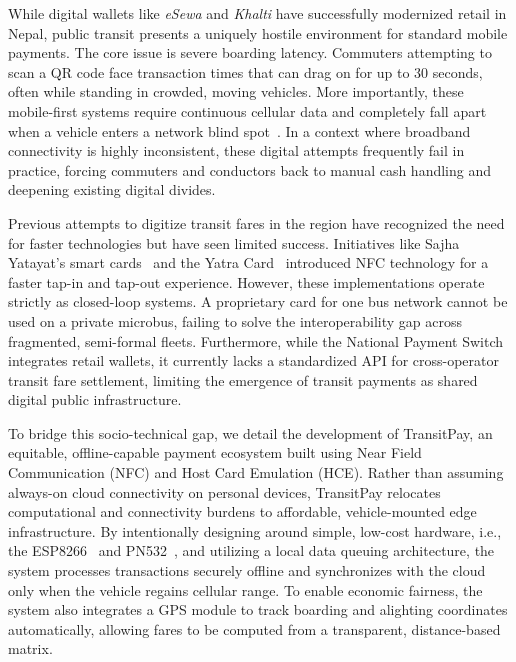 \documentclass[manuscript,review,anonymous]{acmart}
\begin{document}
While digital wallets like \textit{eSewa} and \textit{Khalti} have successfully modernized retail in Nepal, public transit presents a uniquely hostile environment for standard mobile payments. The core issue is severe boarding latency. Commuters attempting to scan a QR code face transaction times that can drag on for up to 30 seconds, often while standing in crowded, moving vehicles. More importantly, these mobile-first systems require continuous cellular data and completely fall apart when a vehicle enters a network blind spot~\cite{gupta2022m, KC_2026,kandel2024financial}. In a context where broadband connectivity is highly inconsistent, these digital attempts frequently fail in practice, forcing commuters and conductors back to manual cash handling and deepening existing digital divides.

Previous attempts to digitize transit fares in the region have recognized the need for faster technologies but have seen limited success. Initiatives like Sajha Yatayat's smart cards~\cite{annapurnaexpress2026article} and the Yatra Card~\cite{fintech2023yatra} introduced NFC technology for a faster tap-in and tap-out experience. However, these implementations operate strictly as closed-loop systems. A proprietary card for one bus network cannot be used on a private microbus, failing to solve the interoperability gap across fragmented, semi-formal fleets. Furthermore, while the National Payment Switch integrates retail wallets, it currently lacks a standardized API for cross-operator transit fare settlement, limiting the emergence of transit payments as shared digital public infrastructure.

To bridge this socio-technical gap, we detail the development of TransitPay, an equitable, offline-capable payment ecosystem built using Near Field Communication (NFC) and Host Card Emulation (HCE). Rather than assuming always-on cloud connectivity on personal devices, TransitPay relocates computational and connectivity burdens to affordable, vehicle-mounted edge infrastructure. By intentionally designing around simple, low-cost hardware, i.e., the ESP8266~\cite{esp8266soc} and PN532~\cite{nxp2016pn532}, and utilizing a local data queuing architecture, the system processes transactions securely offline and synchronizes with the cloud only when the vehicle regains cellular range. To enable economic fairness, the system also integrates a GPS module to track boarding and alighting coordinates automatically, allowing fares to be computed from a transparent, distance-based matrix.
\end{document}
